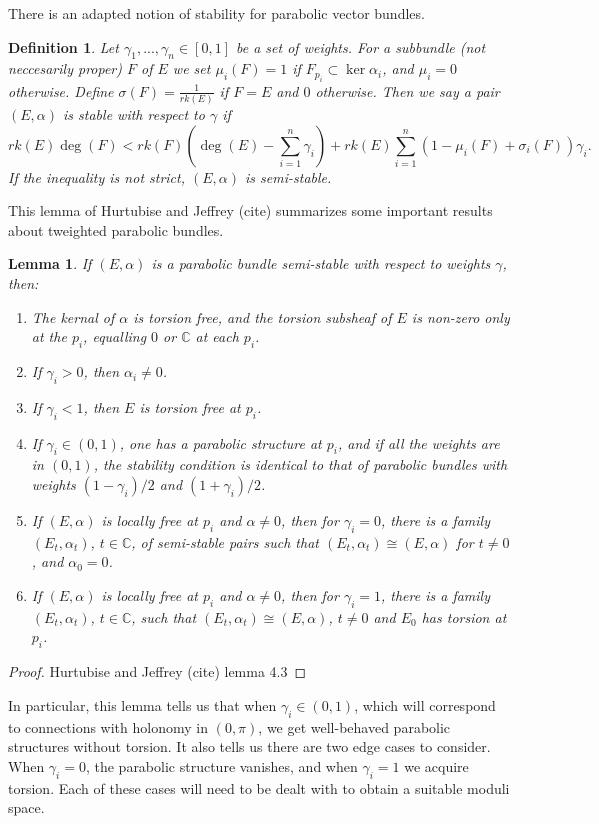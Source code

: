 \documentclass[]{article}
\newtheorem{definition}{Definition}
\newtheorem{lemma}{Lemma}
\newcommand{\C}{\mathbb{C}}
\begin{document}
There is an adapted notion of stability for parabolic vector bundles.
\begin{definition}
	Let $\gamma_1,...,\gamma_n \in [0,1]$ be a set of weights. For a subbundle (not neccesarily proper) $F$ of $E$ we set $\mu_i(F) = 1$ if $F_{p_i} \subset \ker\alpha_i$, and $\mu_i = 0$ otherwise. Define $\sigma(F) = \frac{1}{rk(E)}$ if $F=E$ and $0$ otherwise. Then we say a pair $(E,\alpha)$ is \emph{stable} with respect to $\gamma$ if 
	\begin{equation}
	rk(E)\deg(F) < rk(F)\left(\deg(E) - \sum_{i=1}^n \gamma_i\right) 
	+ rk(E)\sum_{i=1}^n(1 - \mu_i(F) + \sigma_i(F))\gamma_i.
	\end{equation}
	If the inequality is not strict, $(E,\alpha)$ is \emph{semi-stable}.
\end{definition}
This lemma of Hurtubise and Jeffrey (cite) summarizes some important results about tweighted parabolic bundles.
\begin{lemma}
	If $(E,\alpha)$ is a parabolic bundle semi-stable with respect to weights $\gamma$, then:
	\begin{enumerate}
		\item The kernal of $\alpha$ is torsion free, and the torsion subsheaf of $E$ is non-zero only at the $p_i$, equalling $0$ or $\C$ at each $p_i$.
		\item If $\gamma_i >0$, then $\alpha_i \neq 0$.
		\item If $\gamma_i < 1$, then $E$ is torsion free at $p_i$.
		\item If $\gamma_i \in (0,1)$, one has a parabolic structure at $p_i$, and if all the weights are in $(0,1)$, the stability condition is identical to that of parabolic bundles with weights $(1-\gamma_i)/2$ and $(1+\gamma_i)/2$.
		\item If $(E,\alpha)$ is locally free at $p_i$ and $\alpha \neq 0$, then for $\gamma_i = 0$, there is a family $(E_t, \alpha_t)$, $t\in \C$, of semi-stable pairs such that $(E_t,\alpha_t)\cong (E,\alpha)$ for $t\neq 0$, and $\alpha_0 = 0$. 
		\item If $(E,\alpha)$ is locally free at $p_i$ and $\alpha \neq 0$, then for $\gamma_i = 1$, there is a family $(E_t,\alpha_t)$, $t\in \C$, such that $(E_t, \alpha_t)\cong (E,\alpha)$, $t\neq 0$ and $E_0$ has torsion at $p_i$.
	\end{enumerate}
\end{lemma}
\begin{proof}
	Hurtubise and Jeffrey (cite) lemma 4.3
\end{proof}
In particular, this lemma tells us that when $\gamma_i\in (0,1)$, which will correspond to connections with holonomy in $(0,\pi)$, we get well-behaved parabolic structures without torsion. It also tells us there are two edge cases to consider. When $\gamma_i = 0$, the parabolic structure vanishes, and when $\gamma_i = 1$ we acquire torsion. Each of these cases will need to be dealt with to obtain a suitable moduli space.
\end{document}
